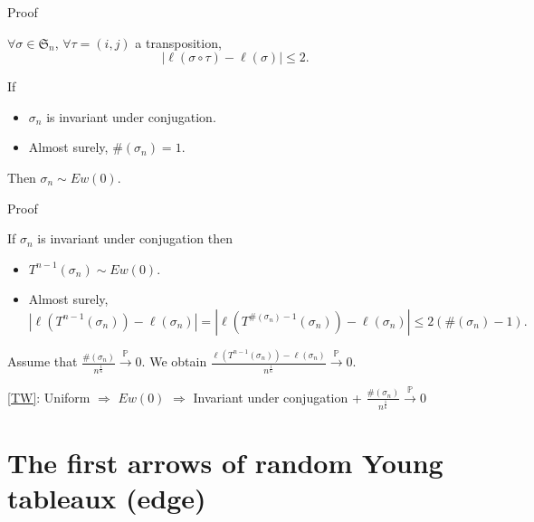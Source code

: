\documentclass[english,xcolor=table]{beamer}
\begin{document}
\begin{frame}{Proof}
\begin{lemma} \label{lem}
 $\forall \sigma \in  \mathfrak{S}_n$,  $ \forall\tau=(i,j)$ a transposition, 
\begin{equation*}
|\ell(\sigma \circ \tau )-\ell(\sigma)|\leq 2.
\end{equation*}
\end{lemma}
\begin{lemma}
If
\begin{itemize}
    \item $\sigma_n$ is invariant under conjugation. 
    \item Almost surely, $\#(\sigma_n)=1$.
\end{itemize}
Then  $\sigma_n \sim Ew(0).$
\end{lemma}
\end{frame}

\begin{frame}{Proof}
\begin{corollary}
If $\sigma_n$ is invariant under conjugation then
\begin{itemize}
    \item $T^{n-1}(\sigma_n)\sim Ew(0).$
    \item Almost surely, $$
|\ell(T^{n-1}(\sigma_n))-\ell(\sigma_n)|=
|\ell(T^{\#(\sigma_n)-1}(\sigma_n))-\ell(\sigma_n)|
\leq  2(\#(\sigma_n)-1).$$
\end{itemize}
Assume that  $\frac{\#(\sigma_n)}{n^\frac16} \overset{\mathbb{P}}\to 0 $.  We obtain $\frac{\ell(T^{n-1}(\sigma_n))-\ell(\sigma_n)}{n^\frac 16} \overset{\mathbb{P}}\to 0$.
\end{corollary}    
\eqref{TW}: Uniform $\Rightarrow$ $Ew(0)$ $\Rightarrow$  Invariant under conjugation +   $\frac{\#(\sigma_n)}{n^\frac16} \overset{\mathbb{P}}\to 0 $
\end{frame}
\section{The first arrows of random Young tableaux (edge)}
\end{document}
